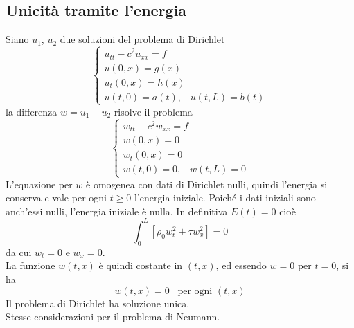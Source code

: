 \subsection{Unicit\`a tramite l'energia}
Siano $u_1$, $u_2$ due soluzioni del problema di Dirichlet
\[
	\left\{
	\begin{array}{l}
		u_{tt} - c^2 u_{xx}= f \\
		u(0,x)=g(x) \\
		u_t(0,x)= h(x)\\
		u(t,0)=a(t), \;\;\; u(t,L)=b(t)
	\end{array}
	\right.
\]
la differenza $w=u_1-u_2$ risolve il problema
\[
	\left\{
	\begin{array}{l}
		w_{tt} - c^2 w_{xx}= f \\
		w(0,x)=0 \\
		w_t(0,x)= 0\\
		w(t,0)=0, \;\;\; w(t,L)=0
	\end{array}
	\right.
\]
L'equazione per $w$ \`e omogenea con dati di Dirichlet nulli, quindi l'energia
si conserva e vale per ogni $t\geq 0$ l'energia iniziale.
Poich\'e i dati iniziali sono anch'essi nulli, l'energia iniziale \`e nulla.
In definitiva $E(t)=0$ cio\`e
\[
	\int_0^L [\rho_0 w^2_t + \tau w_x^2]=0
\]
da cui $w_t=0$ e $w_x=0$.\\
La funzione $w(t,x)$ \`e quindi costante in $(t,x)$, ed essendo $w=0$ per
$t=0$, si ha
\[
	w(t,x)=0 \;\;\; \text{per ogni }(t,x)
\]
Il problema di Dirichlet ha soluzione unica.\\
Stesse considerazioni per il problema di Neumann.
